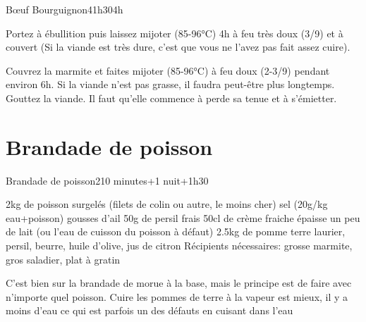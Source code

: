 {\begin{recette}{Bœuf Bourguignon}{4}{1h30}{4h}
\begin{preparation}
\etape Portez à ébullition puis laissez mijoter (85-96°C) 4h à feu très doux (3/9) et à couvert (Si la viande est 
très dure, c'est 
que vous ne l'avez pas fait assez cuire). 
\end{preparation}

\begin{cuisson}
Couvrez la marmite et faites mijoter (85-96°C) à feu doux (2-3/9) pendant environ 6h. Si la viande n'est pas grasse, il faudra peut-être plus longtemps. Gouttez la viande. Il faut qu'elle commence à perde sa tenue et à s'émietter.
\end{cuisson}
\end{recette}

\section{Brandade de poisson}
\begin{recette}{Brandade de poisson}{2}{10 minutes+1 nuit+1h30}{}
\begin{ingredients}
\ingredient 2kg de poisson surgelés (filets de colin ou autre, le moins cher)
\ingredient sel (20g/kg eau+poisson)
 gousses d'ail
\ingredient 50g de persil frais
\ingredient 50cl de crème fraiche épaisse
\ingredient un peu de lait (ou l'eau de cuisson du poisson à défaut)
\ingredient 2.5kg de pomme terre
\ingredient laurier, persil, beurre, huile d'olive, jus de citron
\ingredient Récipients nécessaires: grosse marmite, gros saladier, plat à gratin
\end{ingredients}

\begin{remarque}
C'est bien sur la brandade de morue à la base, mais le 
principe est de faire avec n'importe quel poisson. Cuire les pommes de terre à la vapeur est mieux, il y a moins d'eau ce qui est parfois un des défauts en cuisant dans l'eau
\end{remarque}



\end{recette}}
